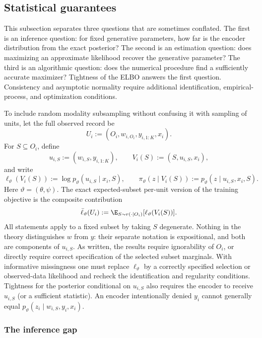 \subsection{Statistical guarantees}
\label{subsec:elbo_tight2}

This subsection separates three questions that are sometimes conflated.  The
first is an inference question: for fixed generative parameters, how far is
the encoder distribution from the exact posterior?  The second is an
estimation question: does maximizing an approximate likelihood recover the
generative parameter?  The third is an algorithmic question: does the
numerical procedure find a sufficiently accurate maximizer?  Tightness of the
ELBO answers the first question.  Consistency and asymptotic normality require
additional identification, empirical-process, and optimization conditions.

To include random modality subsampling without confusing it with sampling of
units, let the full observed record be
\[
 U_i:=(O_i,w_{i,O_i},y_{i,1:K},x_i).
\]
For $S\subseteq O_i$, define
\[
 u_{i,S}:=(w_{i,S},y_{i,1:K}),\qquad
 V_i(S):=(S,u_{i,S},x_i),
\]
and write
\[
 \ell_\vartheta(V_i(S)):=\log p_\vartheta(u_{i,S}\mid x_i,S),
 \qquad
 \pi_\vartheta(z\mid V_i(S))
 :=p_\vartheta(z\mid u_{i,S},x_i,S).
\]
Here $\vartheta=(\theta,\psi)$.  The exact expected-subset per-unit version
of the training objective is the composite contribution
\begin{equation}
 \bar\ell_\vartheta(U_i)
 :=\E_{S\sim r(\cdot\mid O_i)}[\ell_\vartheta(V_i(S))].
 \label{eq:composite_subset_criterion}
\end{equation}
All statements apply to a fixed subset by taking $S$ degenerate.  Nothing in
the theory distinguishes $w$ from $y$: their separate notation is
expositional, and both are components of $u_{i,S}$.  As written, the results
require ignorability of $O_i$, or directly require correct specification of
the selected subset marginals.  With informative missingness one must replace
$\ell_\vartheta$ by a correctly specified selection or observed-data
likelihood and recheck the identification and regularity conditions.
Tightness for the posterior conditional on
$u_{i,S}$ also requires the encoder to receive $u_{i,S}$ (or a sufficient
statistic).  An encoder intentionally denied $y_i$ cannot generally equal
$p_\vartheta(z_i\mid w_{i,S},y_i,x_i)$.

\subsubsection{The inference gap}

